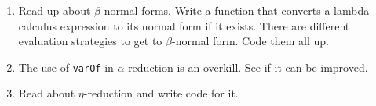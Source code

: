 \documentclass{article}
\begin{document}
\begin{enumerate}[1.]
\item
  Read up about
  \href{http://en.wikipedia.org/wiki/Beta\_normal\_form}{$\beta$-normal}
  forms. Write a function that converts a lambda calculus expression to
  its normal form if it exists. There are different evaluation
  strategies to get to $\beta$-normal form. Code them all up.
\item
  The use of \texttt{varOf} in $\alpha$-reduction is an overkill. See if
  it can be improved.
\item
  Read about $\eta$-reduction and write code for it.
\end{enumerate}
\end{document}
